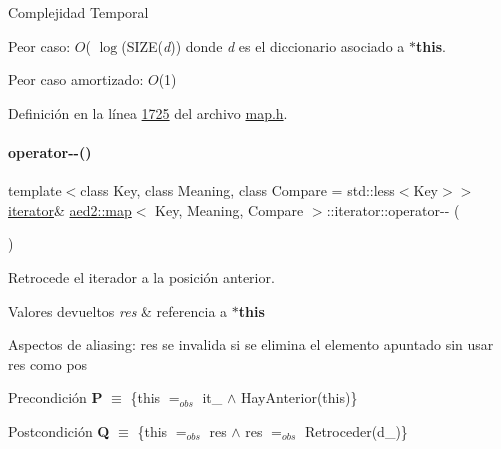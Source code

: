 \begin{DoxyDescription}
\item[Complejidad Temporal]
\begin{DoxyItemize}
\item Peor caso\+: $O$( $\log$(S\+I\+ZE({\itshape d})) donde {\itshape d} es el diccionario asociado a {\bfseries $\ast$this}.
\item Peor caso amortizado\+: $O$(1) 
\end{DoxyItemize}
\end{DoxyDescription}

Definición en la línea \hyperlink{map_8h_source_l01725}{1725} del archivo \hyperlink{map_8h_source}{map.\+h}.

\mbox{\label{classaed2_1_1map_1_1iterator_ae7f70f71545d2a9de17b65edaaec748a_ae7f70f71545d2a9de17b65edaaec748a}} 
\paragraph{\texorpdfstring{operator-\/-\/()}{operator--()}\hspace{0.1cm}{\footnotesize\ttfamily [1/2]}}
{\footnotesize\ttfamily template$<$class Key, class Meaning, class Compare = std\+::less$<$\+Key$>$$>$ \\
\hyperlink{classaed2_1_1map_1_1iterator}{iterator}\& \hyperlink{classaed2_1_1map}{aed2\+::map}$<$ Key, Meaning, Compare $>$\+::iterator\+::operator-\/-\/ (\begin{DoxyParamCaption}{ }\end{DoxyParamCaption})\hspace{0.3cm}{\ttfamily [inline]}}



Retrocede el iterador a la posición anterior. 


\begin{DoxyRetVals}{Valores devueltos}
{\em res} & referencia a {\bfseries $\ast$this}\\
\hline
\end{DoxyRetVals}
\begin{DoxyParagraph}{Aspectos de aliasing\+:}
res se invalida si se elimina el elemento apuntado sin usar res como pos
\end{DoxyParagraph}
\begin{DoxyPrecond}{Precondición}
{\bfseries P} $\equiv$ \{this $=_{obs}$ it\+\_ $\land$ Hay\+Anterior(this)\} 
\end{DoxyPrecond}
\begin{DoxyPostcond}{Postcondición}
{\bfseries Q} $\equiv$ \{this $=_{obs}$ res $\land$ res $=_{obs}$ Retroceder(d\+\_)\}
\end{DoxyPostcond}


